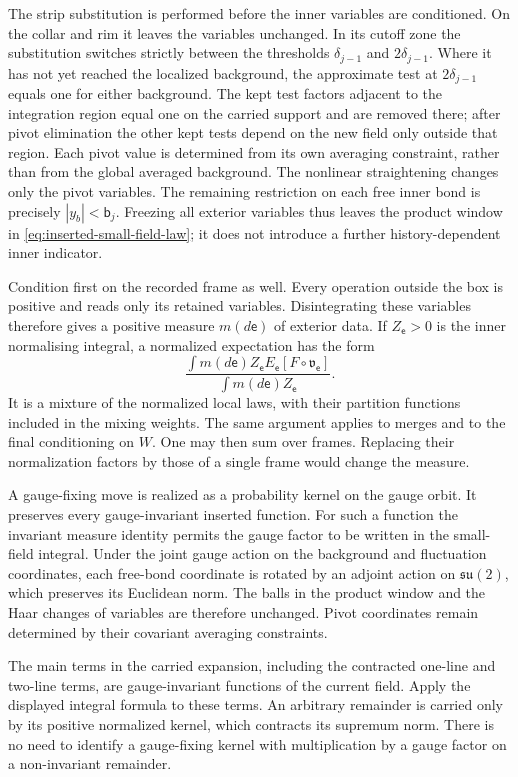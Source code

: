 \documentclass[11pt,letterpaper,reqno]{amsart}
\theoremstyle{definition}
\theoremstyle{remark}
\begin{document}
The strip substitution is performed before the inner variables
are conditioned. On the collar and rim it leaves the variables
unchanged. In its cutoff zone the substitution switches strictly
between the thresholds $\delta_{j-1}$ and $2\delta_{j-1}$.
Where it has not yet reached the localized background, the
approximate test at $2\delta_{j-1}$ equals one for either background.
The kept test factors adjacent to the integration region
equal one on the carried support and are removed there; after pivot
elimination the other kept tests depend on the new field only
outside that region. Each pivot value is determined from its own
averaging constraint, rather than from the global averaged background.
The nonlinear straightening changes only the
pivot variables. The remaining restriction on each free inner bond
is precisely $|y_b|<\mathsf b_j$. Freezing all exterior variables
thus leaves the product window in
\eqref{eq:inserted-small-field-law}; it does not introduce a further
history-dependent inner indicator.

Condition first on the recorded frame as well. Every operation
outside the box is positive and reads only its retained variables.
Disintegrating these variables therefore gives a positive measure
$m(d\mathsf e)$ of exterior data. If $Z_{\mathsf e}>0$ is the
inner normalising integral, a normalized expectation has the form
\[
 \frac{\int m(d\mathsf e)Z_{\mathsf e}
                    E_{\mathsf e}[F\circ\mathfrak v_{\mathsf e}]}
      {\int m(d\mathsf e)Z_{\mathsf e}}.
\]
It is a mixture of the normalized local laws, with their
partition functions included in the mixing weights. The same
argument applies to merges and to the final conditioning on $W$.
One may then sum over frames. Replacing their normalization factors
by those of a single frame would change the measure.

A gauge-fixing move is realized as a probability kernel on the
gauge orbit. It preserves every gauge-invariant inserted function.
For such a function the invariant measure identity permits the
gauge factor to be written in the small-field integral. Under the
joint gauge action on the background and fluctuation coordinates,
each free-bond coordinate is rotated by an adjoint action on
$\mathfrak{su}(2)$, which preserves its Euclidean norm. The balls
in the product window and the Haar changes of variables are
therefore unchanged. Pivot coordinates remain determined by their
covariant averaging constraints.

The main terms in the carried expansion, including the contracted
one-line and two-line terms, are gauge-invariant functions of the
current field. Apply the displayed integral formula to these terms.
An arbitrary remainder is carried only by its positive normalized
kernel, which contracts its supremum norm. There is no need to
identify a gauge-fixing kernel with multiplication by a gauge
factor on a non-invariant remainder.
\end{document}
